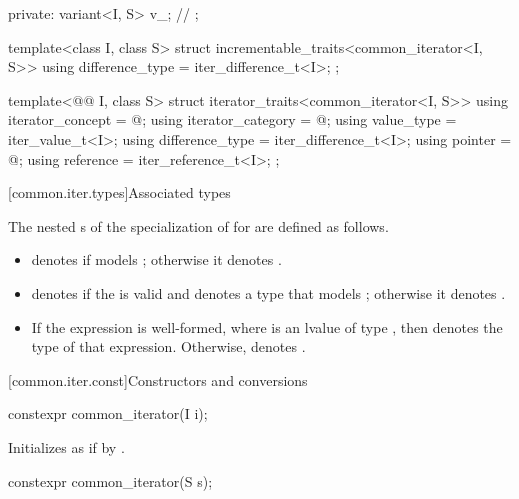 \begin{codeblock}
{{  private:
    variant<I, S> v_;   // \expos
  };

  template<class I, class S>
  struct incrementable_traits<common_iterator<I, S>> {
    using difference_type = iter_difference_t<I>;
  };

  template<@@ I, class S>
  struct iterator_traits<common_iterator<I, S>> {
    using iterator_concept = @\seebelow@;
    using iterator_category = @\seebelow@;
    using value_type = iter_value_t<I>;
    using difference_type = iter_difference_t<I>;
    using pointer = @\seebelow@;
    using reference = iter_reference_t<I>;
  };
}
\end{codeblock}

[common.iter.types]{Associated types}

\pnum
The nested s of the specialization of
 for  are defined as follows.
\begin{itemize}
\item
{} denotes 
if  models ;
otherwise it denotes .

\item
{} denotes
if the  
is valid and denotes a type that
models ;
otherwise it denotes .

\item
If the expression  is well-formed,
where  is an lvalue of type ,
then  denotes the type of that expression.
Otherwise,  denotes .
\end{itemize}

[common.iter.const]{Constructors and conversions}

%
\begin{itemdecl}
constexpr common_iterator(I i);
\end{itemdecl}

\begin{itemdescr}
\pnum
\effects
Initializes  as if by .
\end{itemdescr}

%
\begin{itemdecl}
constexpr common_iterator(S s);
\end{itemdecl}

